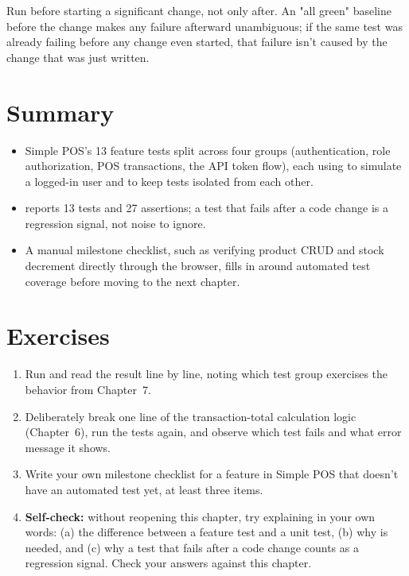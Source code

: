 \begin{tipbox}
Run  before starting a significant change, not
only after. An "all green" baseline before the change makes any failure
afterward unambiguous; if the same test was already failing before any
change even started, that failure isn't caused by the change that was
just written.
\end{tipbox}


\section{Summary}
\label{sec:pengujian-aplikasi-rangkuman}

\begin{itemize}
  \item Simple POS's 13 feature tests split across four groups
    (authentication, role authorization, POS transactions, the API
    token flow), each using  to simulate a logged-in
    user and  to keep tests isolated from
    each other.
  \item {} reports 13 tests and 27 assertions; a
    test that fails after a code change is a regression signal, not
    noise to ignore.
  \item A manual milestone checklist, such as verifying product CRUD and
    stock decrement directly through the browser, fills in around
    automated test coverage before moving to the next chapter.
\end{itemize}

\section{Exercises}

\begin{enumerate}
  \item Run  and read the result line by line,
    noting which test group exercises the behavior from Chapter~7.
  \item Deliberately break one line of the transaction-total
    calculation logic (Chapter~6), run the tests again, and observe
    which test fails and what error message it shows.
  \item Write your own milestone checklist for a feature in Simple POS
    that doesn't have an automated test yet, at least three items.
  \item \textbf{Self-check:} without reopening this chapter, try
    explaining in your own words: (a) the difference between a feature
    test and a unit test, (b) why  is needed,
    and (c) why a test that fails after a code change counts as a
    regression signal. Check your answers against this chapter.
\end{enumerate}

